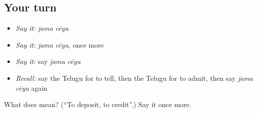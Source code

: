 \subsection*{Your turn}
\begin{itemize}
\raggedright
  \item \emph{Say it:} \emph{jama cēyu}
  \item \emph{Say it:} \emph{jama cēyu}, once more
  \item \emph{Say it:} say \emph{jama cēyu}
  \item \emph{Recall:} say the Telugu for to tell, then the Telugu for to admit, then say \emph{jama cēyu} again
\end{itemize}

\begin{tcolorbox}[breakable,colback=teal!4,colframe=teal!35!black,title={Before you move on}]
What does   mean? (\textquotedblleft{}To deposit, to credit\textquotedblright{}.) Say it once more.
\end{tcolorbox}
